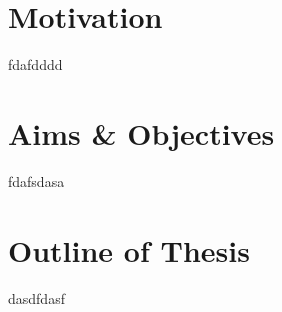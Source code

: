 \documentclass[main.tex]{subfiles}
\begin{document}
    \section{Motivation}
    \justify
    fdafdddd

    \section{Aims \& Objectives}
    \justify
    fdafsdasa

    \section{Outline of Thesis}
    \justify
    dasdfdasf
\end{document}
